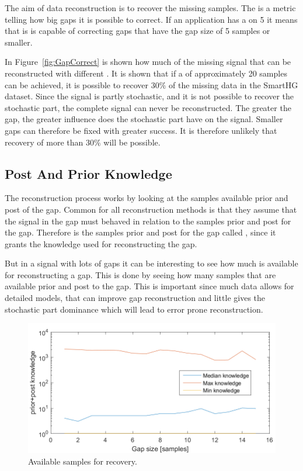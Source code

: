 The aim of data reconstruction is to recover the missing samples. The  is a metric telling how big gaps it is possible to correct. If an application has a  on 5 it means that is is capable of correcting gaps that have the gap size of 5 samples or smaller. 

In Figure~\ref{fig:GapCorrect} is shown how much of the missing signal that can be reconstructed with different . It is shown that if a  of approximately 20 samples can be achieved, it is possible to recover $30\%$ of the missing data in the SmartHG dataset. Since the signal is partly stochastic, and it is not possible to recover the stochastic part, the complete signal can never be reconstructed. The greater the gap, the greater influence does the stochastic part have on the signal. Smaller gaps can therefore be fixed with greater success. It is therefore unlikely that recovery of more than $30\%$ will be possible. 

\subsection{Post And Prior Knowledge}
The reconstruction process works by looking at the samples available prior and post of the gap. Common for all reconstruction methods is that they assume that the signal in the gap must behaved in relation to the samples prior and post for the gap. Therefore is the samples prior and post for the gap called , since it grants the knowledge used for reconstructing the gap. 

But in a signal with lots of gaps it can be interesting to see how much  is available for reconstructing a gap. This is done by seeing how many samples that are available prior and post to the gap. This is important since much data allows for detailed models, that can improve gap reconstruction and little  gives the stochastic part dominance which will lead to error prone reconstruction. 

\begin{figure}[H]
\centering
\includegraphics[width=0.7\linewidth]{billeder/GapInfo2.png}\caption{Available samples for recovery.}
\label{fig:PAF}
\end{figure}

